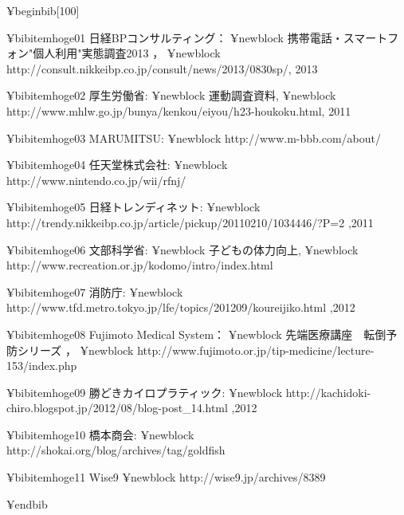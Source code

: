 ¥begin{bib}[100]


¥bibitem{hoge01}
日経BPコンサルティング：
  ¥newblock 携帯電話・スマートフォン"個人利用"実態調査2013 ，
  ¥newblock http://consult.nikkeibp.co.jp/consult/news/2013/0830sp/, 2013
  
  
¥bibitem{hoge02}
厚生労働省:
  ¥newblock 運動調査資料,
  ¥newblock http://www.mhlw.go.jp/bunya/kenkou/eiyou/h23-houkoku.html, 2011
  
 ¥bibitem{hoge03}
  MARUMITSU:
  ¥newblock http://www.m-bbb.com/about/  
  
  
   ¥bibitem{hoge04}
任天堂株式会社:
  ¥newblock http://www.nintendo.co.jp/wii/rfnj/

  
¥bibitem{hoge05}
日経トレンディネット:
  ¥newblock http://trendy.nikkeibp.co.jp/article/pickup/20110210/1034446/?P=2 ,2011
  
  
 ¥bibitem{hoge06}
文部科学省:
 ¥newblock 子どもの体力向上,
¥newblock http://www.recreation.or.jp/kodomo/intro/index.html

  
  
 ¥bibitem{hoge07}
 消防庁:
  ¥newblock http://www.tfd.metro.tokyo.jp/lfe/topics/201209/koureijiko.html ,2012
  
  
¥bibitem{hoge08}
Fujimoto Medical System：
  ¥newblock 先端医療講座　転倒予防シリーズ ，
  ¥newblock http://www.fujimoto.or.jp/tip-medicine/lecture-153/index.php
  
  
  
 ¥bibitem{hoge09}
   勝どきカイロプラティック:
  ¥newblock http://kachidoki-chiro.blogspot.jp/2012/08/blog-post_14.html ,2012
    
  
  ¥bibitem{hoge10}
 橋本商会:
  ¥newblock http://shokai.org/blog/archives/tag/goldfish  
  
  
¥bibitem{hoge11}
Wise9
  ¥newblock http://wise9.jp/archives/8389

  	
¥end{bib}
